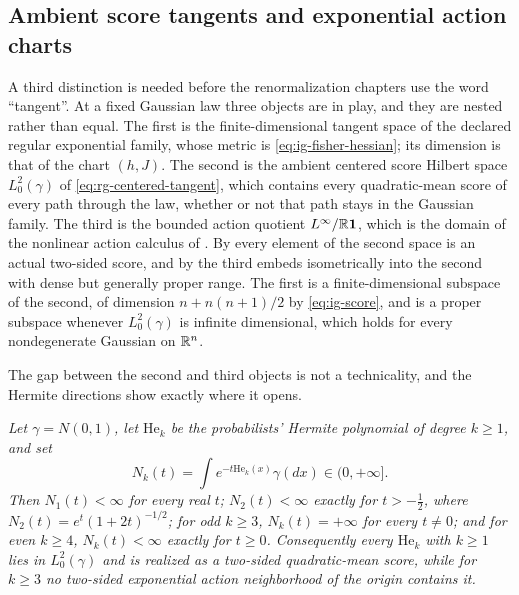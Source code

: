 \subsection{Ambient score tangents and exponential action charts}
\label{sec:ig-score-charts}

A third distinction is needed before the renormalization chapters use the word
``tangent''. At a fixed Gaussian law three objects are in play, and they are
nested rather than equal. The first is the finite-dimensional tangent space of
the declared regular exponential family, whose metric is
\eqref{eq:ig-fisher-hessian}; its dimension is that of the chart
$(h,J)$. The second is the ambient centered score Hilbert space
$L^2_0(\gamma)$ of \eqref{eq:rg-centered-tangent}, which contains every
quadratic-mean score of every path through the law, whether or not that path
stays in the Gaussian family. The third is the bounded action quotient
$L^\infty/\mathbb R\mathbf 1$, which is the domain of the nonlinear action calculus of
. By
 every element of the second space is an actual
two-sided score, and by  the third embeds
isometrically into the second with dense but generally proper range. The first
is a finite-dimensional subspace of the second, of dimension
$n+n(n+1)/2$ by \eqref{eq:ig-score}, and is a proper subspace whenever
$L^2_0(\gamma)$ is infinite dimensional, which holds for every nondegenerate
Gaussian on $\mathbb R^{n}$. 

The gap between the second and third objects is not a technicality, and the
Hermite directions show exactly where it opens.

\medskip
{}
\emph{Let $\gamma=N(0,1)$, let $\mathrm{He}_k$ be the probabilists' Hermite
polynomial of degree $k\geq1$, and set}
\begin{equation}
N_k(t)=\int e^{-t\mathrm{He}_k(x)}\gamma(dx)\in(0,+\infty].
\label{eq:ig-hermite-normalizer}
\end{equation}
\emph{Then $N_1(t)<\infty$ for every real $t$; $N_2(t)<\infty$ exactly for
$t>-\tfrac12$, where $N_2(t)=e^t(1+2t)^{-1/2}$; for odd $k\geq3$,
$N_k(t)=+\infty$ for every $t\neq0$; and for even $k\geq4$, $N_k(t)<\infty$
exactly for $t\geq0$. Consequently every $\mathrm{He}_k$ with $k\geq1$ lies in
$L^2_0(\gamma)$ and is realized as a two-sided quadratic-mean score, while for
$k\geq3$ no two-sided exponential action neighborhood of the origin contains
it.}

